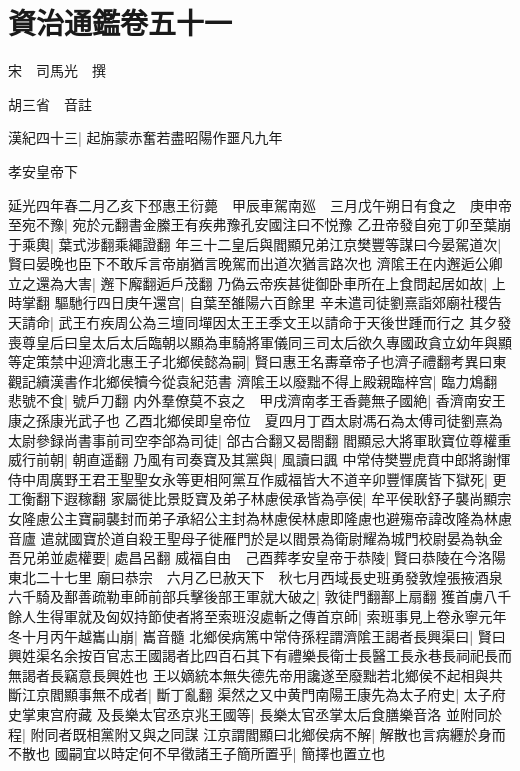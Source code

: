 \chapter{資治通鑑卷五十一}
宋　司馬光　撰

胡三省　音註

漢紀四十三|{
	起旃蒙赤奮若盡昭陽作噩凡九年}


孝安皇帝下

延光四年春二月乙亥下邳惠王衍薨　甲辰車駕南廵　三月戊午朔日有食之　庚申帝至宛不豫|{
	宛於元翻書金縢王有疾弗豫孔安國注曰不悦豫}
乙丑帝發自宛丁卯至葉崩于乘輿|{
	葉式涉翻乘繩證翻}
年三十二皇后與閻顯兄弟江京樊豐等謀曰今晏駕道次|{
	賢曰晏晚也臣下不敢斥言帝崩猶言晚駕而出道次猶言路次也}
濟隂王在内邂逅公卿立之還為大害|{
	邂下廨翻逅戶茂翻}
乃偽云帝疾甚徙御卧車所在上食問起居如故|{
	上時掌翻}
驅馳行四日庚午還宫|{
	自葉至雒陽六百餘里}
辛未遣司徒劉熹詣郊廟社稷告天請命|{
	武王冇疾周公為三壇同墠因太王王季文王以請命于天後世踵而行之}
其夕發喪尊皇后曰皇太后太后臨朝以顯為車騎將軍儀同三司太后欲久專國政貪立幼年與顯等定策禁中迎濟北惠王子北鄉侯懿為嗣|{
	賢曰惠王名夀章帝子也濟子禮翻考異曰東觀記續漢書作北鄉侯犢今從袁紀范書}
濟隂王以廢黜不得上殿親臨梓宫|{
	臨力鴆翻}
悲號不食|{
	號戶刀翻}
内外羣僚莫不哀之　甲戌濟南孝王香薨無子國絶|{
	香濟南安王康之孫康光武子也}
乙酉北鄉侯即皇帝位　夏四月丁酉太尉馮石為太傅司徒劉熹為太尉參録尚書事前司空李郃為司徒|{
	郃古合翻又曷閤翻}
閻顯忌大將軍耿寶位尊權重威行前朝|{
	朝直遥翻}
乃風有司奏寶及其黨與|{
	風讀曰諷}
中常侍樊豐虎賁中郎將謝惲侍中周廣野王君王聖聖女永等更相阿黨互作威福皆大不道辛卯豐惲廣皆下獄死|{
	更工衡翻下遐稼翻}
家屬徙比景貶寶及弟子林慮侯承皆為亭侯|{
	牟平侯耿舒子襲尚顯宗女隆慮公主寶嗣襲封而弟子承紹公主封為林慮侯林慮即隆慮也避殤帝諱改隆為林慮音廬}
遣就國寶於道自殺王聖母子徙雁門於是以閻景為衛尉耀為城門校尉晏為執金吾兄弟並處權要|{
	處昌呂翻}
威福自由　己酉葬孝安皇帝于恭陵|{
	賢曰恭陵在今洛陽東北二十七里}
廟曰恭宗　六月乙巳赦天下　秋七月西域長史班勇發敦煌張掖酒泉六千騎及鄯善疏勒車師前部兵擊後部王軍就大破之|{
	敦徒門翻鄯上扇翻}
獲首虜八千餘人生得軍就及匈奴持節使者將至索班沒處斬之傳首京師|{
	索班事見上卷永寧元年}
冬十月丙午越巂山崩|{
	巂音髓}
北鄉侯病篤中常侍孫程謂濟隂王謁者長興渠曰|{
	賢曰興姓渠名余按百官志王國謁者比四百石其下有禮樂長衛士長醫工長永巷長祠祀長而無謁者長竊意長興姓也}
王以嫡統本無失德先帝用讒遂至廢黜若北鄉侯不起相與共斷江京閻顯事無不成者|{
	斷丁亂翻}
渠然之又中黄門南陽王康先為太子府史|{
	太子府史掌東宫府藏}
及長樂太官丞京兆王國等|{
	長樂太官丞掌太后食膳樂音洛}
並附同於程|{
	附同者既相黨附又與之同謀}
江京謂閻顯曰北鄉侯病不解|{
	解散也言病纒於身而不散也}
國嗣宜以時定何不早徵諸王子簡所置乎|{
	簡擇也置立也}
